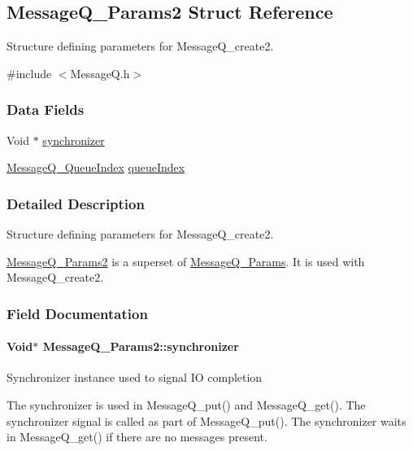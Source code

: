 \subsection{Message\-Q\-\_\-\-Params2 Struct Reference}
\label{struct_message_q___params2}


Structure defining parameters for Message\-Q\-\_\-create2.  




{\ttfamily \#include $<$Message\-Q.\-h$>$}

\subsubsection*{Data Fields}
\begin{DoxyCompactItemize}
\item 
Void $\ast$ \hyperlink{struct_message_q___params2_a021c1136ab8e33fb20d473756842d5c1}{synchronizer}
\item 
\hyperlink{_message_q_8h_a22a5f41fd82f03f7c14f45dab647bada}{Message\-Q\-\_\-\-Queue\-Index} \hyperlink{struct_message_q___params2_a17e609ce59bab5020ae5d180a3df0130}{queue\-Index}
\end{DoxyCompactItemize}


\subsubsection{Detailed Description}
Structure defining parameters for Message\-Q\-\_\-create2. 

\hyperlink{struct_message_q___params2}{Message\-Q\-\_\-\-Params2} is a superset of \hyperlink{struct_message_q___params}{Message\-Q\-\_\-\-Params}. It is used with Message\-Q\-\_\-create2. 

\subsubsection{Field Documentation}
\paragraph[{synchronizer}]{\setlength{\rightskip}{0pt plus 5cm}Void$\ast$ Message\-Q\-\_\-\-Params2\-::synchronizer}\label{struct_message_q___params2_a021c1136ab8e33fb20d473756842d5c1}
Synchronizer instance used to signal I\-O completion \begin{DoxyVerb}   The synchronizer is used in MessageQ_put() and MessageQ_get().
   The synchronizer signal is called as part of MessageQ_put().
   The synchronizer waits in MessageQ_get() if there are no messages
   present.\end{DoxyVerb}
